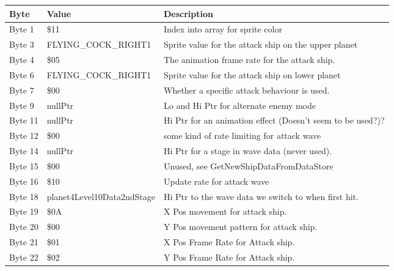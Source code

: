 \begin{figure}[H]
{\begin{adjustbox}{width=12cm}
\begin{tabular}{lll}
\toprule
 Byte    & Value                      & Description                                                        \\
\midrule
 Byte 1  & \$11                        & Index into array for sprite color                                  \\
 Byte 3  & FLYING\_COCK\_RIGHT1         & Sprite value for the attack ship on the upper planet               \\
 Byte 4  & \$05                        & The animation frame rate for the attack ship.                      \\
 Byte 6  & FLYING\_COCK\_RIGHT1         & Sprite value for the attack ship on lower planet                   \\
 Byte 7  & \$00                        & Whether a specific attack behaviour is used.                       \\
 Byte 9  & nullPtr                    & Lo and Hi Ptr for alternate enemy mode                             \\
 Byte 11 & nullPtr                    & Hi Ptr for an animation effect (Doesn't seem to be used?)?         \\
 Byte 12 & \$00                        & some kind of rate limiting for attack wave                         \\
 Byte 14 & nullPtr                    & Hi Ptr for a stage in wave data (never used).                      \\
 Byte 15 & \$00                        & Unused, see GetNewShipDataFromDataStore                            \\
 Byte 16 & \$10                        & Update rate for attack wave                                        \\
 Byte 18 & planet4Level10Data2ndStage & Hi Ptr to the wave data we switch to when first hit.               \\
 Byte 19 & \$0A                        & X Pos movement for attack ship.                                    \\
 Byte 20 & \$00                        & Y Pos movement pattern for attack ship.                            \\
 Byte 21 & \$01                        & X Pos Frame Rate for Attack ship.                                  \\
 Byte 22 & \$02                        & Y Pos Frame Rate for Attack ship.                                  \\

\end{tabular}
\end{adjustbox}}
\end{figure}
